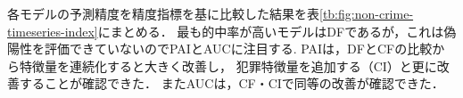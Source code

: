 





各モデルの予測精度を精度指標を基に比較した結果を表\ref{tb:fig:non-crime-timeseries-index}にまとめる．
最も的中率が高いモデルはDFであるが，これは偽陽性を評価できていないのでPAIとAUCに注目する.
PAIは，DFとCFの比較から特徴量を連続化すると大きく改善し，
犯罪特徴量を追加する（CI）と更に改善することが確認できた．
またAUCは，CF・CIで同等の改善が確認できた．

